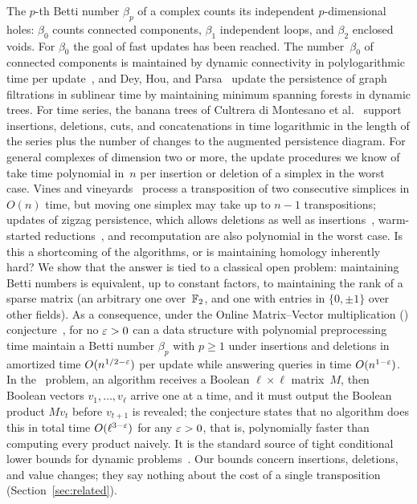 The $p$-th Betti number $\beta_p$ of a complex counts its independent $p$-dimensional holes: $\beta_0$ counts connected components, $\beta_1$ independent loops, and $\beta_2$ enclosed voids.
For $\beta_0$ the goal of fast updates has been reached.
The number~$\beta_0$ of connected components is maintained by dynamic connectivity in polylogarithmic time per update~\cite{HDT01,WN13,KKM13}, and Dey, Hou, and Parsa~\cite{DHP23} update the persistence of graph filtrations in sublinear time by maintaining minimum spanning forests in dynamic trees.
For time series, the banana trees of Cultrera di Montesano et al.~\cite{CEHO24} support insertions, deletions, cuts, and concatenations in time logarithmic in the length of the series plus the number of changes to the augmented persistence diagram.
For general complexes of dimension two or more, the update procedures we know of take time polynomial in~$n$ per insertion or deletion of a simplex in the worst case.
Vines and vineyards~\cite{CEMS06} process a transposition of two consecutive simplices in $O(n)$ time, but moving one simplex may take up to $n-1$ transpositions; updates of zigzag persistence, which allows deletions as well as insertions~\cite{DH21u}, warm-started reductions~\cite{LN21}, and recomputation are also polynomial in the worst case.
Is this a shortcoming of the algorithms, or is maintaining homology inherently hard?
We show that the answer is tied to a classical open problem: maintaining Betti numbers is equivalent, up to constant factors, to maintaining the rank of a sparse matrix (an arbitrary one over~$\mathbb{F}_2$, and one with entries in $\{0,\pm1\}$ over other fields).
As a consequence, under the Online Matrix--Vector multiplication (\OMv) conjecture~\cite{HKNS15}, for no $\varepsilon>0$ can a data structure with polynomial preprocessing time maintain a Betti number $\beta_p$ with $p\ge1$ under insertions and deletions in amortized time $O(n^{1/2-\varepsilon})$ per update while answering queries in time $O(n^{1-\varepsilon})$.
In the \OMv\ problem, an algorithm receives a Boolean $\ell\times\ell$ matrix~$M$, then Boolean vectors $v_1,\dots,v_\ell$ arrive one at a time, and it must output the Boolean product $Mv_t$ before $v_{t+1}$ is revealed; the conjecture states that no algorithm does this in total time $O(\ell^{3-\varepsilon})$ for any $\varepsilon>0$, that is, polynomially faster than computing every product naively.
It is the standard source of tight conditional lower bounds for dynamic problems~\cite{HKNS15}.
Our bounds concern insertions, deletions, and value changes; they say nothing about the cost of a single transposition (Section~\ref{sec:related}).


